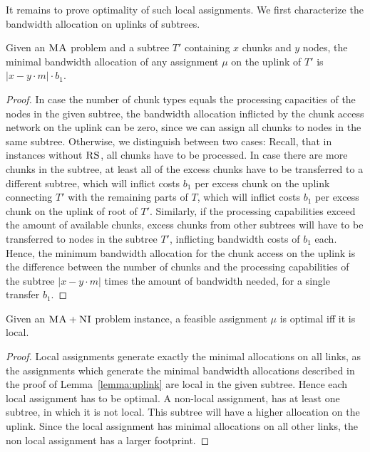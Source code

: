 \documentclass[conference,10pt]{IEEEtran}
\newcommand{\MaFactor}{m}
\newcommand{\VmChunkAssignment}{\mu}
\newcommand{\CC}{\textsc{NI}}
\newcommand{\RS}{\textsc{RS}}
\newcommand{\MA}{\textsc{MA}}
\newcommand{\Tree}{\ensuremath{T}}
\newcommand{\CostTrans}{\ensuremath{b_1}}
\begin{document}
It remains to prove optimality of such local assignments.
We first characterize the bandwidth allocation on uplinks of subtrees.
\begin{lemma}\label{lem:uplink-alloc}
Given an $\MA$ problem and a subtree $\Tree'$
containing $x$
chunks and $y$ nodes, the minimal bandwidth allocation of any
assignment
$\VmChunkAssignment$ on the uplink of $\Tree'$ is $|x-y\cdot\MaFactor|\cdot
\CostTrans$.
\label{lemma:uplink}
\end{lemma}
\begin{proof}
In case the number of chunk types equals the processing capacities of the
nodes in the given subtree,
the bandwidth allocation inflicted by the chunk access network on the uplink can
be
zero, since we can assign all chunks to nodes in the same subtree.
Otherwise, we distinguish between two cases: Recall, that in instances
without $\RS$, all chunks have to be processed. In case
there are more chunks in the subtree, at least all of the excess chunks have to
be transferred to a different subtree, which will
inflict costs $\CostTrans$ per excess chunk on the uplink connecting $\Tree'$
with the
remaining parts of $\Tree$, which will inflict costs $\CostTrans$ per excess chunk on the uplink of root of $\Tree'$.
 Similarly, if the processing capabilities exceed the
amount of
available chunks, excess chunks from other subtrees will have to be transferred
to
nodes in the subtree $\Tree'$, inflicting bandwidth costs of $\CostTrans$ each.
Hence, the minimum bandwidth allocation for the chunk access on the uplink
is the difference between the number of chunks and the processing capabilities
of the subtree $|x-y\cdot\MaFactor|$ times the amount of bandwidth needed,
for a single transfer $\CostTrans$.
\end{proof}


\begin{theorem}
Given an $\MA+\CC$ problem instance, a feasible assignment $\VmChunkAssignment$
is optimal iff it is local.
\label{thm:local_optimal}
\end{theorem}

\begin{proof}
Local assignments generate exactly the minimal allocations on all links, as
 the assignments which generate the minimal bandwidth allocations
described in
the proof of
Lemma~\ref{lemma:uplink} are local in the given subtree. Hence
each local assignment has to be optimal. A non-local assignment, has at least
one subtree, in which it is not local. This subtree will have a higher
allocation on the uplink. Since the local assignment has minimal allocations
on all other links, the non local assignment has a larger footprint.
\end{proof}
\end{document}
